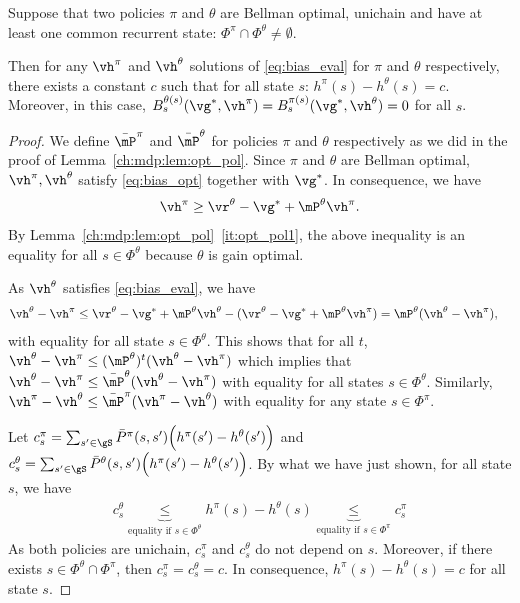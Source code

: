 \begin{lem}
    \label{ch:mdp:lem:equi_bias}
    Suppose that two policies $\pi$ and $\theta$ are Bellman optimal, unichain and have at least one common recurrent state: $\Phi^\pi\cap\Phi^\theta\neq\emptyset$.
    
    Then for any $\vh^\pi$ and $\vh^\theta$ solutions of \eqref{eq:bias_eval} for $\pi$ and $\theta$ respectively, there exists a constant $c$ such that for all state $s$: $h^\pi(s) -h^\theta(s) =c$. Moreover, in this case, ${B_s^{\theta(s)}(\vg^*, \vh^\pi)=B_s^{\pi(s)}(\vg^*, \vh^\theta)=0}$ for all $s$.
\end{lem}
\begin{proof}
    We define $\bar{\mP}^\pi$ and $\bar{\mP}^\theta$ for policies $\pi$ and $\theta$ respectively as we did in the proof of Lemma~\ref{ch:mdp:lem:opt_pol}.
    Since $\pi$ and $\theta$ are Bellman optimal, $\vh^\pi,\vh^\theta$ satisfy \eqref{eq:bias_opt} together with $\vg^*$.
    In consequence, we have
    \begin{align*}
        \vh^\pi \ge \vr^\theta -\vg^* +\mP^\theta\vh^\pi.
    \end{align*}
    By Lemma~\ref{ch:mdp:lem:opt_pol}~\ref{it:opt_pol1}, the above inequality is an equality for all $s\in\Phi^\theta$ because $\theta$ is gain optimal.

    As $\vh^\theta$ satisfies \eqref{eq:bias_eval}, we have
    \begin{align*}
        \vh^\theta -\vh^\pi &\le \vr^\theta -\vg^* +\mP^\theta\vh^\theta -(\vr^\theta -\vg^* +\mP^\theta\vh^\pi) = \mP^\theta(\vh^\theta -\vh^\pi),
    \end{align*}
    with equality for all state $s\in\Phi^\theta$. This shows that for all $t$, $\vh^\theta -\vh^\pi\le (\mP^\theta)^t(\vh^\theta -\vh^\pi)$ which implies that $\vh^\theta -\vh^\pi\le \bar{\mP}^\theta(\vh^\theta -\vh^\pi)$ with equality for all states $s\in\Phi^\theta$. Similarly, $\vh^\pi -\vh^\theta \le \bar{\mP}^\pi(\vh^\pi -\vh^\theta)$ with equality for any state $s\in\Phi^\pi$.

    Let $c^\pi_s=\sum_{s'\in\gS}\bar{P}^\pi(s,s')\Big(h^\pi(s')-h^\theta(s')\Big)$ and $c^\theta_s=\sum_{s'\in\gS}\bar{P}^\theta(s,s')\Big(h^\pi(s')-h^\theta(s')\Big)$. By what we have just shown, for all state $s$, we have
    \begin{align*}
        c^\theta_s \underbrace{\le}_{\text{equality if $s\in\Phi^\theta$}} h^\pi(s)-h^\theta(s) \underbrace{\le}_{\text{equality if $s\in\Phi^\pi$}} c^\pi_s
    \end{align*}
    As both policies are unichain, $c^\pi_s$ and $c^\theta_s$ do not depend on $s$.
    Moreover, if there exists $s\in\Phi^\theta\cap\Phi^\pi$, then $c^\pi_s=c^\theta_s = c$. In consequence,  $h^\pi(s)-h^\theta(s)=c$ for all state $s$. 
\end{proof}

